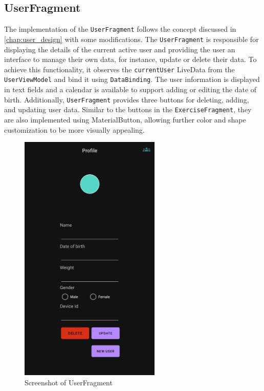 \subsection{UserFragment}
The implementation of the \texttt{UserFragment} follows the concept discussed in \autoref{chap:user_design} with some modifications. 
The \texttt{UserFragment} is responsible for displaying the details of the current active user and providing the user an interface to manage their own data, for instance, update or delete their data. 
To achieve this functionality, it observes the \texttt{currentUser} LiveData from the \texttt{UserViewModel} and bind it using \texttt{DataBinding}. 
The user information is displayed in text fields and a calendar is available to support adding or editing the date of birth. 
Additionally, \texttt{UserFragment} provides three buttons for deleting, adding, and updating user data. Similar to the buttons in the \texttt{ExerciseFragment}, they are also implemented using MaterialButton, allowing further color and shape customization to be more visually appealing.
\begin{figure}[H]
    \centering
    \includegraphics[width=0.6\textwidth]{images/userfragment-screenshot.png}
    \caption{Screenshot of UserFragment}
    \label{fig:userfragment_screenshot}
\end{figure}

